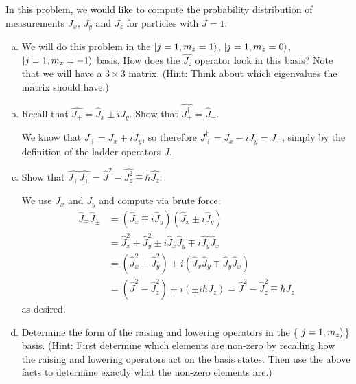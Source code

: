 \documentclass[10pt]{article}
\begin{document}
    In this problem, we would like to compute the probability distribution of measurements $J_x$, $J_y$ and $J_z$ for particles with $J = 1$. 

    \begin{enumerate}[(a)]
        \item We will do this problem in the $\ket{j = 1, m_z = 1}$, $\ket {j= 1, m_z = 0}$, $\ket{j = 1, m_z = -1}$ basis. How does the $\hat{J_z}$ operator look in this basis? Note that we will have a $3 \times 3$ matrix. (Hint: Think about which eigenvalues the matrix should have.)
        \item Recall that $\hat {J_\pm} = \hat J_x \pm i \hat {J_y}$. Show that $\hat{J_+^\dagger} = \hat J_-$. 
        
        \begin{solution}
            We know that $J_+ = J_x + iJ_y$, so therefore $J_+^\dagger = J_x - iJ_y = J_-$, simply by the definition of the ladder operators $J$.
        \end{solution}
        \item Show that $\hat{J_\mp}\hat{J_\pm} = \hat J^2 - \hat{J_z^2} \mp \hbar \hat{J_z}$. 
        
        \begin{solution}
            We use $J_x$ and $J_y$ and compute via brute force: 
                \begin{align*}
                    \hat{J}_{\mp}\hat{J}_{\pm} &= (\hat{J}_x \mp i\hat{J}_y)(\hat{J}_x \pm i\hat{J}_y) \\
                    &= \hat{J}_x^2 + \hat{J}_{y}^2 \pm i\hat{J}_x\hat{J}_y \mp i\hat{J_y}\hat{J}_x\\
                    &= (\hat{J}_x^2 + \hat{J}_y^2) \pm i(\hat{J}_x\hat{J}_y \mp \hat{J}_y\hat{J}_x)\\
                    &= (\hat{J}^2 - \hat{J}_z^2) + i(\pm i\hbar J_z) = \hat{J}^2 - \hat{J}_z^2 \mp \hbar J_z
                \end{align*}
                as desired.
        \end{solution}
        \item Determine the form of the raising and lowering operators in the \{$\ket{j = 1, m_z}$\} basis. (Hint: First determine which elements are non-zero by recalling how the raising and lowering operators act on the basis states. Then use the above facts to determine exactly what the non-zero elements are.)
        
        \begin{solution}
            

\end{solution}
\end{enumerate}
\end{document}
